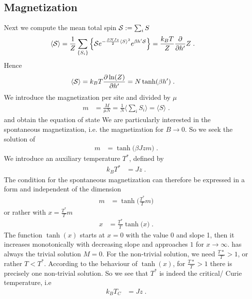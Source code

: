 \subsection{Magnetization}
Next we compute the mean total spin ${\cal S}:=\sum_{i}S$
%
\begin{align*}
\left\langle\cal S\right\rangle
&=\frac{1}{Z}\sum_{\{S_{i}\}} 
\left\{ 
{\cal S} e^{-\frac{\beta N J z}{2}\langle S \rangle^{2}} e^{\beta h' {\cal S}}
\right\}
= \frac{k_{B}T}{Z} \frac{\partial }{\partial h'} Z\;.
\end{align*}
%
Hence
%
\begin{align}\label{eq:}
\left\langle\cal S\right\rangle &=k_{B}T\frac{\partial \ln(Z)}{\partial h'}
= N \tanh(\beta h')\;.
\end{align}
We introduce the magnetization per site and divided by $\mu$
%
\begin{align}
m &= \frac{M}{\mu N} = \frac{1}{N}\langle\sum_{i}S_{i}  \rangle = \langle S \rangle\;.
\end{align}
%
%
and obtain the equation of state
We are particularly interested in the spontaneous magnetization, i.e. the magnetization for
$B\to 0$. So we seek the solution of
%
\begin{align}\label{eq:magnetization:mfa}
m &= \tanh\big( \beta J z m\big)\;.
\end{align}
%
We introduce an auxiliary  temperature $T^{*}$, defined by
%
\begin{align}\label{eq:}
k_{B}T^{*} &= J z\;.
\end{align}
%
The condition for the spontaneous magnetization can therefore be expressed in a form and independent of the dimension
%
\begin{align}\label{eq:ising:mfa:mag}
m &=\tanh\big( \frac{T^{*}}{T} m \big)
\end{align}
%
or rather with $x = \frac{T^{*}}{T}m$
\begin{align}\label{eq:magnetization:mf}
x &= \frac{T^{*}}{T} \tanh\big( x \big)\;.
\end{align}
The function $\tanh(x)$ starts at $x=0$ with the value $0$ and slope 1, then it increases monotonically with  decreasing slope and approaches $1$ for $x\to \infty$.  
 has always the trivial solution $M=0$. For the non-trivial solution,
we need $\frac{T^{}*}{T}>1$, or rather $T<T^{*}$. According to the behaviour of $\tanh(x)$, for $\frac{T^{}*}{T}> 1$ there is precisely one non-trivial solution.
So we see that $T^{*}$ is indeed the critical/ Curie temperature, i.e
%
\begin{align}\label{eq:}
k_{B} T_{C}&=J z\;.
\end{align}
%


